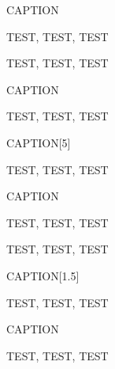 \begin{ascolorbox8}{CAPTION}

TEST, TEST, TEST

\end{ascolorbox8}

\begin{ascolorbox8}{}

TEST, TEST, TEST

\end{ascolorbox8}

\begin{ascolorbox9}{CAPTION}

TEST, TEST, TEST

\end{ascolorbox9}




\begin{ascolorbox9}{CAPTION}[5]

TEST, TEST, TEST

\end{ascolorbox9}

\begin{ascolorbox10}{CAPTION}

TEST, TEST, TEST

\end{ascolorbox10}

\begin{ascolorbox10}{}

TEST, TEST, TEST

\end{ascolorbox10}

\begin{ascolorbox10}{CAPTION}[1.5]

TEST, TEST, TEST

\end{ascolorbox10}

\begin{ascolorbox11}{CAPTION}

TEST, TEST, TEST

\end{ascolorbox11}

